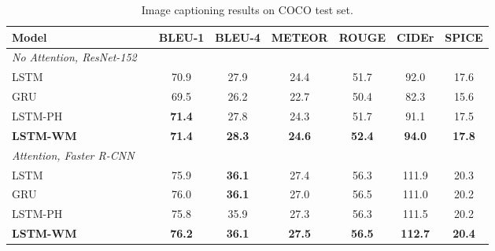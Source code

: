 \begin{table}[t]
\centering
\caption{Image captioning results on COCO test set.}
\footnotesize
\label{tab:captioning}
\setlength{\tabcolsep}{.3em}
\begin{tabular}{lccccccc}
\toprule
\textbf{Model} & & \textbf{BLEU-1} & \textbf{BLEU-4}  & \textbf{METEOR}  & \textbf{ROUGE} & \textbf{CIDEr} & \textbf{SPICE}  \\
\midrule
\textit{No Attention, ResNet-152} \\
\hspace{4mm}LSTM & & 70.9 & 27.9 & 24.4 & 51.7 & 92.0 & 17.6 \\
\hspace{4mm}GRU & & 69.5 & 26.2 & 22.7 & 50.4 & 82.3 & 15.6 \\
\hspace{4mm}LSTM-PH & & \textbf{71.4} & 27.8 & 24.3 & 51.7 & 91.1 & 17.5 \\
\hspace{4mm}\textbf{LSTM-WM} & & \textbf{71.4} & \textbf{28.3} & \textbf{24.6} & \textbf{52.4} & \textbf{94.0} & \textbf{17.8} \\
\midrule
\textit{Attention, Faster R-CNN}\\
\hspace{4mm}LSTM & & 75.9 & \textbf{36.1} & 27.4 & 56.3 & 111.9 & 20.3 \\
\hspace{4mm}GRU & & 76.0 & \textbf{36.1} & 27.0 & 56.5 & 111.0 & 20.2 \\
\hspace{4mm}LSTM-PH & & 75.8 & 35.9 & 27.3 & 56.3 & 111.5 & 20.2 \\
\hspace{4mm}\textbf{LSTM-WM} & & \textbf{76.2} & \textbf{36.1} & \textbf{27.5} & \textbf{56.5} & \textbf{112.7} & \textbf{20.4} \\
\bottomrule
\end{tabular}
\end{table}
